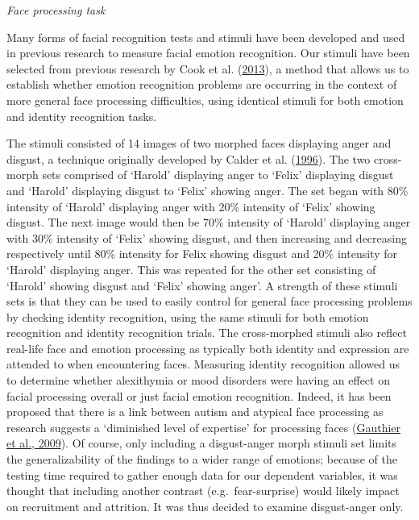 \documentclass[
]{article}
\begin{document}
\emph{Face processing task}

Many forms of facial recognition tests and stimuli have been developed and used in previous research to measure facial emotion recognition. Our stimuli have been selected from previous research by Cook et al. (\protect\hyperlink{ref-cook2013a}{2013}), a method that allows us to establish whether emotion recognition problems are occurring in the context of more general face processing difficulties, using identical stimuli for both emotion and identity recognition tasks.

The stimuli consisted of 14 images of two morphed faces displaying anger and disgust, a technique originally developed by Calder et al. (\protect\hyperlink{ref-calder1996a}{1996}). The two cross-morph sets comprised of `Harold' displaying anger to `Felix' displaying disgust and `Harold' displaying disgust to `Felix' showing anger. The set began with 80\% intensity of `Harold' displaying anger with 20\% intensity of `Felix' showing disgust. The next image would then be 70\% intensity of `Harold' displaying anger with 30\% intensity of `Felix' showing disgust, and then increasing and decreasing respectively until 80\% intensity for Felix showing disgust and 20\% intensity for `Harold' displaying anger. This was repeated for the other set consisting of `Harold' showing disgust and `Felix' showing anger'. A strength of these stimuli sets is that they can be used to easily control for general face processing problems by checking identity recognition, using the same stimuli for both emotion recognition and identity recognition trials. The cross-morphed stimuli also reflect real-life face and emotion processing as typically both identity and expression are attended to when encountering faces. Measuring identity recognition allowed us to determine whether alexithymia or mood disorders were having an effect on facial processing overall or just facial emotion recognition. Indeed, it has been proposed that there is a link between autism and atypical face processing as research suggests a `diminished level of expertise' for processing faces (\protect\hyperlink{ref-gauthier2009a}{Gauthier et al., 2009}). Of course, only including a disgust-anger morph stimuli set limits the generalizability of the findings to a wider range of emotions; because of the testing time required to gather enough data for our dependent variables, it was thought that including another contrast (e.g.~fear-surprise) would likely impact on recruitment and attrition. It was thus decided to examine disgust-anger only.
\end{document}
